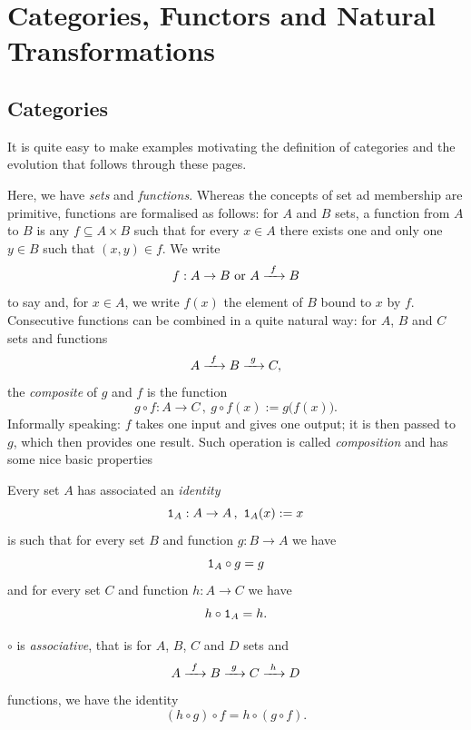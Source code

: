 
\chapter{Categories, Functors and Natural Transformations}

\section{Categories}

It is quite easy to make examples motivating the definition of
categories and the evolution that follows through these pages.

\begin{example}\label{example:Set}
  Here, we have {\em sets} and {\em functions}. Whereas the concepts of
  set ad membership are primitive, functions are formalised as follows:
  for \(A\) and \(B\) sets, a function from \(A\) to \(B\) is any
  \(f \subseteq A \times B\) such that for every \(x \in A\) there exists one and only
  one \(y \in B\) such that \((x, y ) \in f\). We write
  \[
    f : A \to B \ \text{or} \ A \xrightarrow{\ f\ } B
  \]
  to say  and, for
  \(x \in A\), we write \(f(x)\) the element of \(B\) bound to \(x\) by
  \(f\). Consecutive functions can be combined in a quite natural way:
  for \(A\), \(B\) and \(C\) sets and functions
  \[
    A \xrightarrow{\ f\ } B \xrightarrow{\ g\ } C ,
  \]
  the {\em composite} of \(g\) and \(f\) is the function
  \[
    g \circ f : A \to C \,,\ g \circ f(x) := g\big(f(x)\big) .
  \]
  Informally speaking: \(f\) takes one input and gives one output; it is
  then passed to \(g\), which then provides one result. Such operation
  is called {\em composition} and has some nice basic properties
  \begin{tcbenum}
  \item Every set \(A\) has associated an {\em identity}
    \[
      \mathtt 1_A : A \to A \,,\ \mathtt 1_A (x) := x
    \]
    is such that for every set \(B\) and function \(g : B \to A\) we have
    \[
      \mathtt 1_A \circ g = g
    \]
    and for every set \(C\) and function \(h : A \to C\) we have
    \[
      h \circ \mathtt 1_A = h .
    \]
  \item \(\circ\) is {\em associative}, that is for \(A\), \(B\), \(C\) and
    \(D\) sets and
    \[
      A \xrightarrow{\ f\ } B \xrightarrow{\ g\ } C \xrightarrow{\ h\ } D
    \]
    functions, we have the identity
    \[
      (h \circ g) \circ f = h \circ (g \circ f) .
    \]
  \end{tcbenum}
\end{example}

